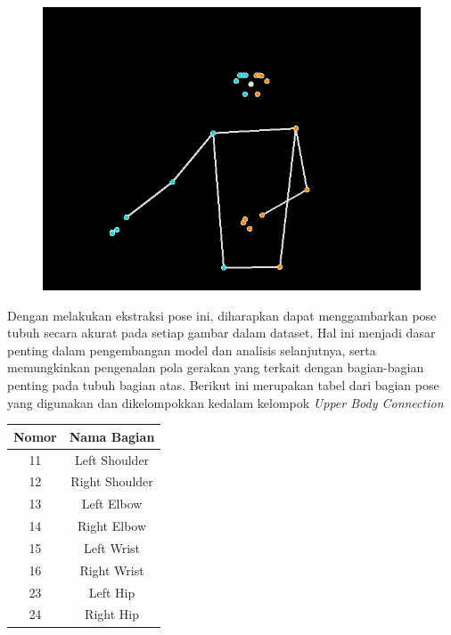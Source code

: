 \begin{figure}[hbt!]
	\centering
	\includegraphics[width=0.6\linewidth]{gambar/Gambar3.4.jpg}
	\label{fig:CITRAAKHIR1}
\end{figure}
Dengan melakukan ekstraksi pose ini, diharapkan dapat menggambarkan pose tubuh secara akurat pada setiap gambar dalam dataset. Hal ini menjadi dasar penting dalam pengembangan model dan analisis selanjutnya, serta memungkinkan pengenalan pola gerakan yang terkait dengan bagian-bagian penting pada tubuh bagian atas. Berikut ini merupakan tabel dari bagian pose yang digunakan dan dikelompokkan kedalam kelompok \textit{Upper Body Connection}
\begin{center}
	\begin{table}[hbt!]
		\label{tbl:PoseLandmarks}
		\centering
		\begin{tabular}{cc}
			\hline
			Nomor & Nama Bagian \\
			\hline
			
			11 & Left Shoulder \\
			\hline
			
			12 & Right Shoulder \\
			\hline
			
			13 & Left Elbow \\
			\hline
			
			14 & Right Elbow \\
			\hline
			
			15 & Left Wrist \\
			\hline
			
			16 & Right Wrist \\
			\hline
			
			23 & Left Hip \\
			\hline
			
			24 & Right Hip \\
			\hline
		\end{tabular}
	\end{table}
	\end{center}
